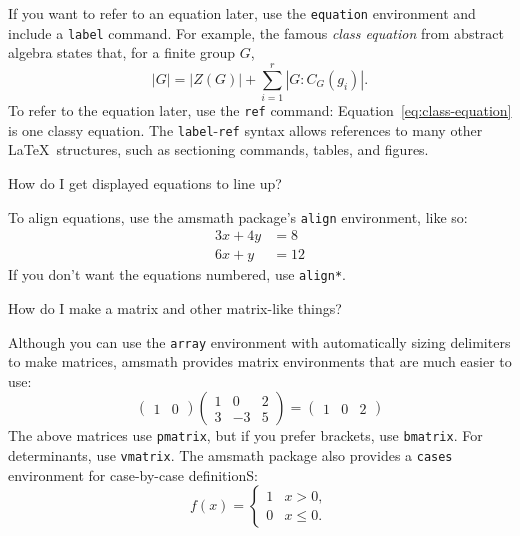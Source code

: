 \documentclass[12pt,letterpaper,noheader]{hmcpset}
\newcommand{\bslash}{\symbol{'134}}%
\newcommand{\bsl}{{\texttt{\bslash}}}
\newcommand{\cmd}[1]{\bsl\texttt{#1}}
\newcommand{\pkg}[1]{\textsf{#1}}
\newcommand{\env}[1]{\texttt{#1}}
\begin{document}
\begin{solution}
If you want to refer to an equation later, use the \env{equation} environment and include a \cmd{label} command. For example, the famous \emph{class equation} from abstract algebra states that, for a finite group $G$, 
\begin{equation} \label{eq:class-equation}
  |G| = |Z(G)| + \sum_{i = 1}^r |G : C_G(g_i)|.
\end{equation}
To refer to the equation later, use the \cmd{ref} command: Equation~\ref{eq:class-equation} is one classy equation. The \cmd{label}-\cmd{ref} syntax allows references to many other \LaTeX\ structures, such as sectioning commands, tables, and figures.
\end{solution}

\begin{problem}
How do I get displayed equations to line up? 
\end{problem}

\begin{solution}
To align equations, use the \pkg{amsmath} package's \env{align} environment, like so:
\begin{align}
  3x + 4y &= 8 \\
  6x + y &= 12
\end{align}
If you don't want the equations numbered, use \env{align*}. 
\end{solution}

\begin{problem}
How do I make a matrix and other matrix-like things?
\end{problem}

\begin{solution}
Although you can use the \env{array} environment with automatically sizing delimiters to make matrices, \pkg{amsmath} provides matrix environments that are much easier to use:
\[
  \begin{pmatrix} 1 & 0  \end{pmatrix} 
  \begin{pmatrix} 1 & 0 & 2 \\ 3 & -3 & 5 \end{pmatrix}
  = \begin{pmatrix} 1 & 0 & 2 \end{pmatrix}
\]
The above matrices use \env{pmatrix}, but if you prefer brackets, use \env{bmatrix}. For determinants, use \env{vmatrix}. The \pkg{amsmath} package also provides a \env{cases} environment for case-by-case definitionS:
\[
  f(x) = \begin{cases} 1 & x > 0, \\ 0 & x \leq 0. \end{cases}
\]
\end{solution}
\end{document}
